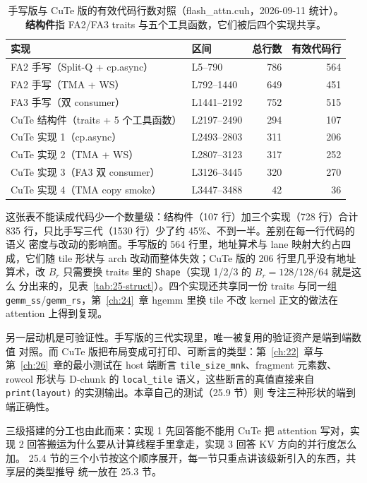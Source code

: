 \begin{table}[htbp]
\centering
\caption{手写版与 CuTe 版的有效代码行数对照（flash\_attn.cuh，2026-09-11 统计）。
\textbf{结构件}指 FA2/FA3 traits 与五个工具函数，它们被后四个实现共享。}
\label{tab:25-code}
\begin{tabular}{llrr}
\toprule
实现 & 区间 & 总行数 & 有效代码行 \\
\midrule
FA2 手写（Split-Q + cp.async） & L5--790 & 786 & 564 \\
FA2 手写（TMA + WS） & L792--1440 & 649 & 451 \\
FA3 手写（双 consumer） & L1441--2192 & 752 & 515 \\
\midrule
CuTe 结构件（traits + 5 个工具函数） & L2197--2490 & 294 & 107 \\
CuTe 实现 1（cp.async） & L2493--2803 & 311 & 206 \\
CuTe 实现 2（TMA + WS） & L2807--3123 & 317 & 252 \\
CuTe 实现 3（FA3 双 consumer） & L3126--3445 & 320 & 270 \\
CuTe 实现 4（TMA copy smoke） & L3447--3488 & 42 & 36 \\
\bottomrule
\end{tabular}
\end{table}

这张表不能读成代码少一个数量级：结构件（107 行）加三个实现（728 行）合计
835 行，只比手写三代（1530 行）少了约 45\%、不到一半。差别在每一行代码的语义
密度与改动的影响面。手写版的 564 行里，地址算术与 lane 映射大约占四成，它们随
tile 形状与 arch 改动而整体失效；CuTe 版的 206 行里几乎没有地址算术，改 $B_r$
只需要换 traits 里的 \texttt{Shape}（实现 1/2/3 的 $B_r{=}128/128/64$ 就是这么
分出来的，见表~\ref{tab:25-struct}）。四个实现还共享同一份 traits 与同一组
\texttt{gemm\_ss}/\texttt{gemm\_rs}，第~\ref{ch:24}~章 hgemm 里换 tile 不改
kernel 正文的做法在 attention 上得到复现。

另一层动机是可验证性。手写版的三代实现里，唯一被复用的验证资产是端到端数值
对照。而 CuTe 版把布局变成可打印、可断言的类型：第~\ref{ch:22}~章与
第~\ref{ch:26}~章的最小测试在 host 端断言
\texttt{tile\_\allowbreak{}size\_\allowbreak{}mnk}、fragment 元素数、rowcol 形状与
D-chunk 的 \texttt{local\_tile} 语义，这些断言的真值直接来自
\texttt{print\allowbreak{}(layout)} 的实测输出。本章自己的测试（25.9 节）则
专注三种形状的端到端正确性。

三级搭建的分工也由此而来：实现 1 先回答能不能用 CuTe 把 attention 写对，实现 2
回答搬运为什么要从计算线程手里拿走，实现 3 回答 KV 方向的并行度怎么加。
25.4 节的三个小节按这个顺序展开，每一节只重点讲该级新引入的东西，共享层的类型推导
统一放在 25.3 节。

